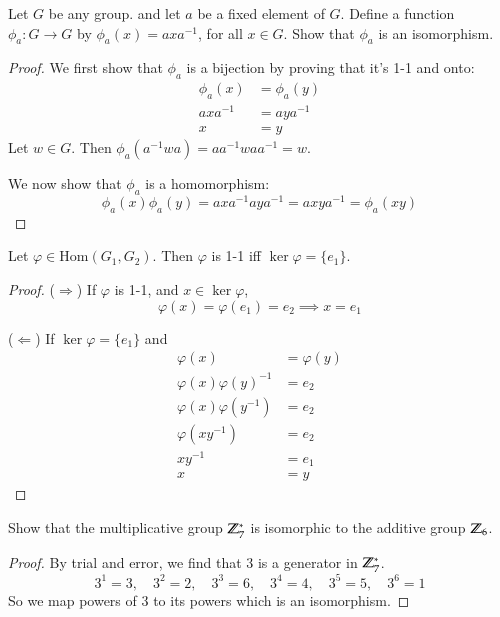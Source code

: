 Let $G$ be any group. and let $a$ be a fixed element of $G$. Define a function $\phi_a: G\to G$ by $\phi_a(x)=axa^{-1}$, for all $x\in G$. Show that $\phi_a$ is an isomorphism. 
\begin{proof}
We first show that $\phi_a$ is a bijection by proving that it's 1-1 and onto:
\begin{align*}
	\phi_a(x) &= \phi_a(y) \\
	axa^{-1} &= aya^{-1} \\
	x &= y
\end{align*}
Let $w\in G$. Then $\phi_a(a^{-1}wa) = aa^{-1}waa^{-1} = w$. 

We now show that $\phi_a$ is a homomorphism: 
\[\phi_a(x)\phi_a(y) = axa^{-1}aya^{-1} = axya^{-1} = \phi_a(xy)\]
\end{proof}

\begin{proposition}
Let $\varphi\in \mathrm{Hom}(G_1, G_2)$. Then $\varphi$ is 1-1 iff $\ker \varphi = \{e_1\}$.
\end{proposition}
\begin{proof}
($\Rightarrow$) If $\varphi$ is 1-1, and $x\in \ker \varphi$, 
\[\varphi(x) = \varphi(e_1)=e_2 \implies x=e_1\]	

($\Leftarrow$) If $\ker \varphi = \{e_1\}$ and
\begin{align*}
\varphi(x) &= \varphi(y) \\
\varphi(x)\varphi(y)^{-1} &= e_2 \\
	\varphi(x)\varphi(y^{-1}) &= e_2 \\
	\varphi(xy^{-1}) &= e_2 \\
	xy^{-1} &= e_1 \\
	x &= y
\end{align*}
\end{proof}

 Show that the multiplicative group $\mathbb{Z}_7^*$ is isomorphic to the additive group $\mathbb{Z}_6$. 
\begin{proof}
By trial and error, we find that $3$ is a generator in $\mathbb{Z}_7^*$. 
\[3^1 = 3, \quad 3^2 = 2, \quad 3^3 = 6, \quad 3^4 = 4, \quad 3^5 = 5, \quad 3^6 = 1\]
So we map powers of $3$ to its powers which is an isomorphism. 
\end{proof}


